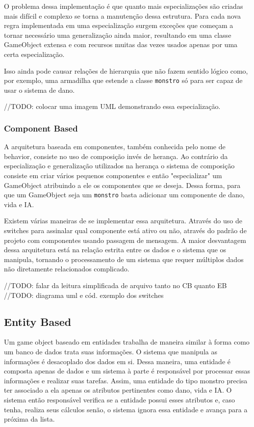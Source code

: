 \documentclass[12pt, 
openright, 
oneside, 
a4paper,    
brazil]{facom-ufu-abntex2}
\begin{document}
O problema dessa implementação é que quanto mais especializações são criadas mais difícil e complexo se torna a manutenção dessa estrutura. Para cada nova regra implementada em uma especialização surgem exceções que começam a tornar necessário uma generalização ainda maior, resultando em uma classe GameObject extensa e com recursos muitas das vezes usados apenas por uma certa especialização.

Isso ainda pode causar relações de hierarquia que não fazem sentido lógico como, por exemplo, uma armadilha que estende a classe \texttt{monstro} só para ser capaz de usar o sistema de dano.

//TODO: colocar uma imagem UML demonstrando essa especialização. 

\subsubsection{Component Based}
A arquitetura baseada em componentes, também conhecida pelo nome de behavior, consiste no uso de composição invés de herança. Ao contrário da especialização e generalização utilizados na herança o sistema de composição consiste em criar vários pequenos componentes e então "especializar" um GameObject atribuindo a ele os componentes que se deseja. Dessa forma, para que um GameObject seja um \texttt{monstro} basta adicionar um componente de dano, vida e IA.

Existem várias maneiras de se implementar essa arquitetura. Através do uso de switches para assinalar qual componente está ativo ou não, através do padrão de projeto com componentes usando passagem de mensagem. A maior desvantagem dessa arquitetura está na relação estrita entre os dados e o sistema que os manipula, tornando o processamento de um sistema que requer múltiplos dados não diretamente relacionados complicado.

//TODO: falar da leitura simplificada de arquivo tanto no CB quanto EB
//TODO: diagrama uml e cód. exemplo dos switches


\subsection{Entity Based}
Um game object baseado em entidades trabalha de maneira similar à forma como um banco de dados trata suas informações. O sistema que manipula as informações é desacoplado dos dados em si. Dessa maneira, uma entidade é composta apenas de dados e um sistema à parte é responsável por processar essas informações e realizar suas tarefas.
Assim, uma entidade do tipo monstro precisa ter associado a ela apenas os atributos pertinentes como dano, vida e IA. O sistema então responsável verifica se a entidade possui esses atributos e, caso tenha, realiza seus cálculos senão, o sistema ignora essa entidade e avança para a próxima da lista.
\end{document}
